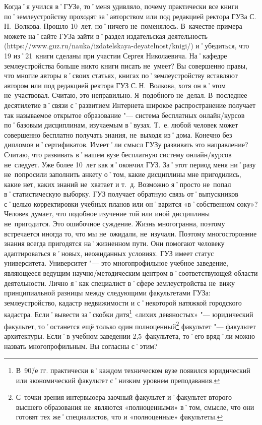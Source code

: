 \begin{drama}
	\maxspeaks Когда˚я учился в˚ГУЗе, то˚меня удивляло, почему практически все книги по˚землеустройству проходят за˚авторством или под редакцией ректора ГУЗа С.\,Н.~Волкова. Прошло 10~лет, но˚ничего не~поменялось. В~качестве примера можете на˚сайте ГУЗа зайти в˚раздел издательская деятельность (https://www.guz.ru/nauka/izdatelskaya-deyatelnost/knigi/) и˚убедиться, что 19 из˚21~книги сделаны при участии Сергея Николаевича. На˚кафедре землеустройства больше никто книги писать не~умеет? 
	\michaelspeaks Вы совершенно правы, что многие авторы в˚своих статьях, книгах по˚землеустройству вставляют автором или под редакцией ректора ГУЗ С.\,Н.~Волкова, хотя он в˚этом не~участвовал. Считаю, это неправильно. Я~подобного не~делал. 
	\maxspeaks В~последнее десятилетие в˚связи с˚развитием Интернета широкое распространение получает так называемое открытое образование "--- система бесплатных онлайн\-/курсов по˚базовым дисциплинам, изучаемым в˚вузах. Т.~е. любой человек может совершенно бесплатно получать знания, не~выходя из˚дома. Конечно без дипломов и˚сертификатов. Имеет˚ли смысл ГУЗу развивать это направление?
	\michaelspeaks Считаю, что развивать в˚нашем вузе бесплатную систему онлайн\-/курсов не~следует.
	\maxspeaks Уже более 10~лет как я˚окончил ГУЗ. За˚этот период меня ни˚разу не~попросили заполнить анкету о˚том, какие дисциплины мне пригодились, какие нет, каких знаний не~хватает и т.~д. Возможно я˚просто не~попал в˚статистическую выборку. ГУЗ получает обратную связь от˚выпускников с˚целью корректировки учебных планов или он˚варится  «в˚собственном соку»?
	\michaelspeaks Человек думает, что подобное изучение той или иной дисциплины не~пригодится. Это ошибочное суждение. Жизнь многогранна, поэтому встречается иногда то, что мы не~ожидали, не~изучали. Поэтому многосторонние знания всегда пригодятся на˚жизненном пути. Они помогают человеку адаптироваться в˚новых, неожиданных условиях.
	\maxspeaks ГУЗ имеет статус университета. Университет "--- это многопрофильное учебное заведение, являющееся ведущим научно\-/методическим центром в˚соответствующей области деятельности. 
Лично я˚как специалист в˚сфере землеустройства не~вижу принципиальной разницы между следующими факультетами ГУЗа: землеустройство, кадастр недвижимости и с˚некоторой натяжкой городского кадастра. Если˚вывести за˚скобки дитя\footnote{В~90\=/е гг. практически в˚каждом техническом вузе появился юридический или экономический факультет с˚низким уровнем преподавания.}  «лихих девяностых» "--- юридический факультет, то˚останется ещё только один полноценный\footnote{С~точки зрения интервьюера заочный факультет и˚факультет второго высшего образования не~являются  «полноценными» в˚том, смысле, что они готовят тех же˚специалистов, что и  «полноценные» факультеты.} факультет "--- факультет архитектуры. Если˚в учебном заведении 2,5~факультета, то˚его вряд˚ли можно назвать многопрофильным. Вы согласны с˚этим?

\end{drama}
